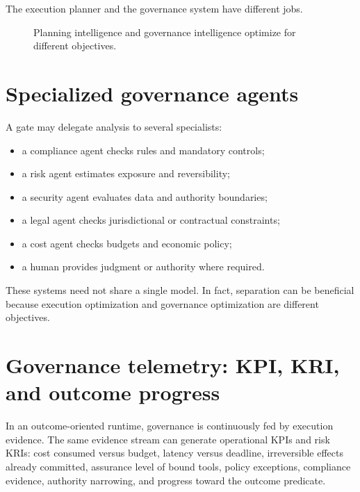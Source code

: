 \documentclass[10pt,oneside,openany]{book}
\begin{document}
The execution planner and the governance system have different jobs.

\begin{figure}[ht]
\centering
{}
\caption{Planning intelligence and governance intelligence optimize for different objectives.}
\end{figure}

\section{Specialized governance agents}
A gate may delegate analysis to several specialists:

\begin{itemize}
\item a compliance agent checks rules and mandatory controls;
\item a risk agent estimates exposure and reversibility;
\item a security agent evaluates data and authority boundaries;
\item a legal agent checks jurisdictional or contractual constraints;
\item a cost agent checks budgets and economic policy;
\item a human provides judgment or authority where required.
\end{itemize}

These systems need not share a single model. In fact, separation can be beneficial because execution optimization and governance optimization are different objectives.

\section{Governance telemetry: KPI, KRI, and outcome progress}
In an outcome-oriented runtime, governance is continuously fed by execution evidence. The same evidence stream can generate operational KPIs and risk KRIs: cost consumed versus budget, latency versus deadline, irreversible effects already committed, assurance level of bound tools, policy exceptions, compliance evidence, authority narrowing, and progress toward the outcome predicate.
\end{document}
